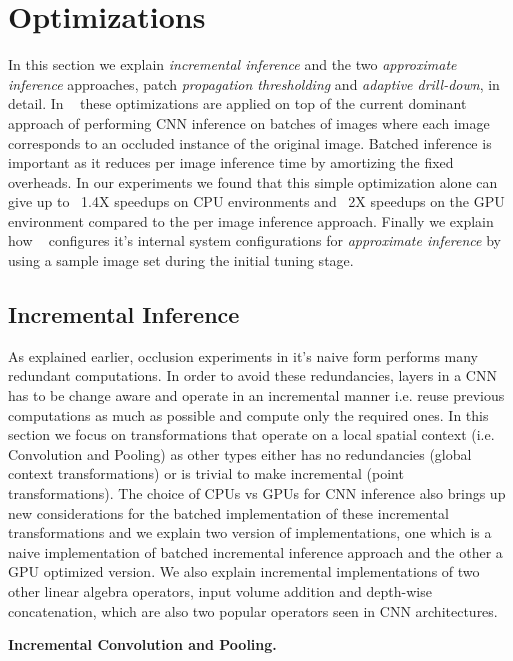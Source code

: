 \section{Optimizations}

In this section we explain \textit{incremental inference} and the two \textit{approximate inference} approaches, patch \textit{propagation thresholding} and \textit{adaptive drill-down}, in detail.
In \system~ these optimizations are applied on top of the current dominant approach of performing CNN inference on batches of images where each image corresponds to an occluded instance of the original image.
Batched inference is important as it reduces per image inference time by amortizing the fixed overheads.
In our experiments we found that this simple optimization alone can give up to ~1.4X speedups on CPU environments and ~2X speedups on the GPU environment compared to the per image inference approach.
Finally we explain how \system~ configures it's internal system configurations for \textit{approximate inference} by using a sample image set during the initial tuning stage.

\subsection{Incremental Inference}\label{sec:inc_computation}

As explained earlier, occlusion experiments in it's naive form performs many redundant computations.
In order to avoid these redundancies, layers in a CNN has to be change aware and operate in an incremental manner i.e. reuse previous computations as much as possible and compute only the required ones.
In this section we focus on transformations that operate on a local spatial context (i.e. Convolution and Pooling) as other types either has no redundancies (global context transformations) or is trivial to make incremental (point transformations).
The choice of CPUs vs GPUs for CNN inference also brings up new considerations for the batched implementation of these incremental transformations and we explain two version of implementations, one which is a naive implementation of batched incremental inference approach and the other a GPU optimized version.
We also explain incremental implementations of two other linear algebra operators, input volume addition and depth-wise concatenation, which are also two popular operators seen in CNN architectures.

\vspace{2mm}
\noindent \textbf{Incremental Convolution and Pooling.}


